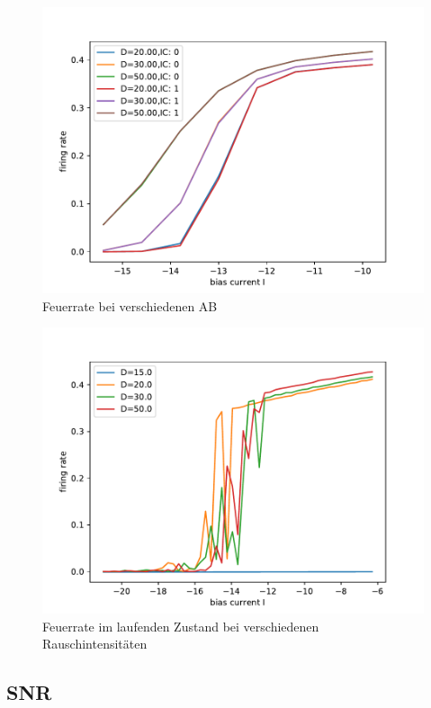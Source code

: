 \documentclass[12pt,a4paper]{article}
\begin{document}
\begin{figure}[H]
\centering
\includegraphics[scale=1]{gneursinglerealrinzel15ninv0realrinzel15ninv1.pdf}\caption{Feuerrate bei verschiedenen AB}
\label{grinzelab}
\end{figure}
\begin{figure}[H]
	\centering
	\includegraphics[scale=1]{firingraterinzelnoise3.pdf}\caption{Feuerrate im laufenden Zustand bei verschiedenen Rauschintensitäten}
	\label{gnoise}
\end{figure}
\subsection{SNR}
\end{document}
